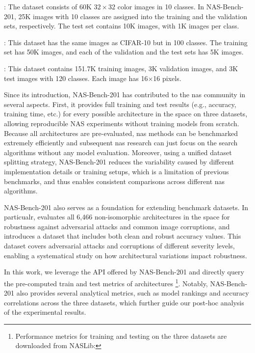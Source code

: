 \documentclass[a4paper,oneside,bibliography=totoc]{scrbook}
\begin{document}
\begin{description}[leftmargin=0cm, listparindent=\parindent]
 	\item[CIFAR10]:	The dataset consists of 60K $32\times32$ color images in 10 classes. In NAS-Bench-201, 25K images with 10 classes are assigned into the training and the validation sets, respectively. The test set contains 10K images, with 1K images per class.
 	\item[CIFAR100]: This dataset has the same images as CIFAR-10 but in 100 classes. The training set has 50K images, and each of the validation and the test sets has 5K images.
 	\item[ImageNet-16-120]: This dataset contains 151.7K training images, 3K validation images, and 3K test images with 120 classes. Each image has 16$\times$16 pixels.
\end{description} 


Since its introduction, NAS-Bench-201 has contributed to the \gls{nas} community in several aspects. First, it provides full training and test results (e.g., accuracy, training time, etc.) for every possible architecture in the space on three datasets, allowing reproducible NAS experiments without training models from scratch. Because all architectures are pre-evaluated, \gls{nas} methods can be benchmarked extremely efficiently and subsequent \gls{nas} research can just focus on the search algorithms without any model evaluation. Moreover, using a unified dataset splitting strategy, NAS-Bench-201 reduces the variability caused by different implementation details or training setups, which is a limitation of previous benchmarks, and thus enables consistent comparisons across different \gls{nas} algorithms. 

\vspace{0.2em}	
NAS-Bench-201 also serves as a foundation for extending benchmark datasets. In particualr, \cite{jung2023neural} evaluates all 6,466 non-isomorphic architectures in the space for robustness against adversarial attacks and common image corruptions, and introduces a dataset that includes both clean and robust accuracy values. This dataset covers adversarial attacks and corruptions of different severity levels, enabling a systematical study on how architectural variations impact robustness.

\vspace{0.2em}
In this work, we leverage the API offered by NAS-Bench-201 and directly query the pre-computed train and test metrics of architectures \footnote{Performance metrics for training and testing on the three datasets are downloaded from NASLib: }. Notably, NAS-Bench-201 also provides several analytical metrics, such as model rankings and accuracy correlations across the three datasets, which further guide our post-hoc analysis of the experimental results.
\end{document}
